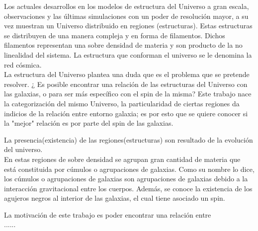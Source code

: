 

\begin{abstracts}

Los actuales desarrollos en los modelos de estructura del Universo a gran escala, observaciones y las \'ultimas simulaciones con un poder de resoluci\'on mayor, a su vez muestran un Universo distribuido en regiones (estructuras). Estas estructuras  se distribuyen de una manera compleja y en forma de filamentos. Dichos filamentos representan una sobre densidad de materia y son producto de la no linealidad del sistema. La estructura que conforman el universo se le denomina la red c\'osmica. \\

La estructura del Universo plantea una duda que es el problema que se pretende resolver. ¿ Es posible encontrar una relaci\'on de las estructuras del Universo con las galaxias, o para ser m\'as específico con el spin de la misma?  Este trabajo nace la categorizaci\'on del mismo Universo, la particularidad de ciertas regiones da indicios de la relaci\'on entre entorno  galaxia; es por esto que se quiere conocer si la "mejor" relaci\'on es por parte del spin de las galaxias.

La presencia(existencia) de las regiones(estructuras) son resultado de la evoluci\'on del universo. \\

En estas regiones de sobre densidad se agrupan gran cantidad de materia que est\'a constituida por c\'umulos o agrupaciones de galaxias. Como su nombre lo dice, los c\'umulos o agrupaciones de galaxias son agrupaciones de galaxias debido a la interacci\'on gravitacional entre los cuerpos. Además, se conoce  la existencia de los agujeros negros al interior de las galaxias, el cual tiene asociado un spin. 

La motivaci\'on de este trabajo es poder encontrar una relaci\'on entre  \\


......



\end{abstracts}


